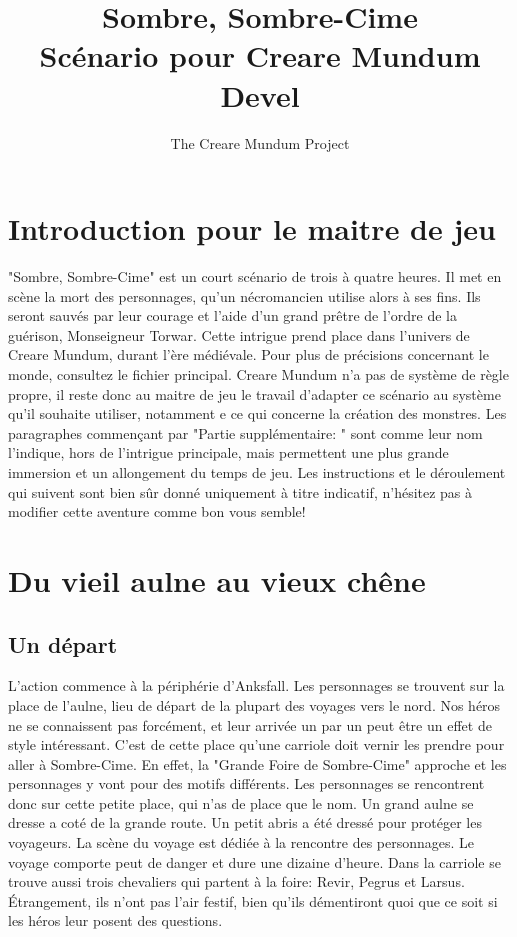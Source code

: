 \documentclass[a4paper, 11pt]{article}
\title{Sombre, Sombre-Cime\\ Scénario pour Creare Mundum \\ Devel}
\author{The Creare Mundum Project}
\date{\oldstylenums{\insertdate}}
\begin{document}
\maketitle
\setcounter{tocdepth}{1} %
\renewcommand{\contentsname}{Sommaire} 
\tableofcontents
\newpage

\section{Introduction pour le maitre de jeu}
"Sombre, Sombre-Cime" est un court scénario de trois à quatre heures. Il met en scène la mort des personnages, qu'un nécromancien utilise alors à ses fins. Ils seront sauvés par leur courage et l'aide d'un grand prêtre de l'ordre de la guérison, Monseigneur Torwar.
Cette intrigue prend place dans l'univers de Creare Mundum, durant l'ère médiévale. Pour plus de précisions concernant le monde, consultez le fichier principal.
\newline
Creare Mundum n'a pas de système de règle propre, il reste donc au maitre de jeu le travail d'adapter ce scénario au système qu'il souhaite utiliser, notamment e ce qui concerne la création des monstres.
\newline
Les paragraphes commençant par "Partie supplémentaire: " sont comme leur nom l'indique, hors de l'intrigue principale, mais permettent une plus grande immersion et un allongement du temps de jeu.
\newline
Les instructions et le déroulement qui suivent sont bien sûr donné uniquement à titre indicatif, n'hésitez pas à modifier cette aventure comme bon vous semble!

\section{Du vieil aulne au vieux chêne}
\subsection{Un départ}
L'action commence à la périphérie d'Anksfall. Les personnages se trouvent sur la place de l’aulne, lieu de départ de la plupart des voyages vers le nord. Nos héros ne se connaissent pas forcément, et leur arrivée un par un peut être un effet de style intéressant. C'est de cette place qu'une carriole doit vernir les prendre pour aller à Sombre-Cime. En effet, la "Grande Foire de Sombre-Cime" approche et les personnages y vont pour des motifs différents. Les personnages  se rencontrent donc sur cette petite place, qui n'as de place que le nom. Un grand aulne se dresse a coté de la grande route. Un petit abris a été dressé pour protéger les voyageurs. La scène du voyage est dédiée à la rencontre des personnages. Le voyage comporte peut de danger et dure une dizaine d'heure. Dans la carriole se trouve aussi trois chevaliers qui partent à la foire: Revir, Pegrus et Larsus. Étrangement, ils n'ont pas l'air festif, bien qu'ils démentiront quoi que ce soit si les héros leur posent des questions.
\end{document}
